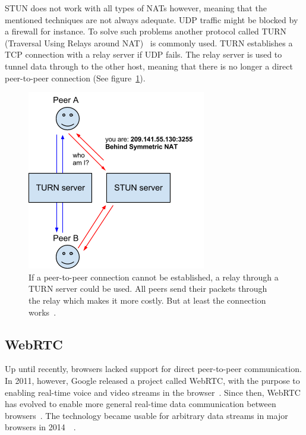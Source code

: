 STUN does not work with all types of NATs however, meaning that the mentioned techniques are not always adequate. UDP traffic might be blocked by a firewall for instance. To solve such problems another protocol called TURN (Traversal Using Relays around NAT)~\cite{RFC5766:Online} is commonly used. TURN establishes a TCP connection with a relay server if UDP fails. The relay server is used to tunnel data through to the other host, meaning that there is no longer a direct peer-to-peer connection (See figure~\ref{fig:WebRTC - TURN}).

\begin{figure}[htp]
\centering
\includegraphics[width=\textwidth,height=0.2\paperheight,keepaspectratio
]{figures/webrtc-turn}
\caption{If a peer-to-peer connection cannot be established, a relay through a TURN server could be used. All peers send their packets through the relay which makes it more costly. But at least the connection works~\cite{WebRTCArchitecture:2014:Online}.}
\label{fig:WebRTC - TURN}
\end{figure}

\subsection{WebRTC}

Up until recently, browsers lacked support for direct peer-to-peer communication. In 2011, however, Google released a project called WebRTC, with the purpose to enabling real-time voice and video streams in the browser~\cite{WebRTCMemo:Online}. Since then, WebRTC has evolved to enable more general real-time data communication between browsers~\cite{WebRTC:Online}. The technology became usable for arbitrary data streams in major browsers in 2014~\cite{WebRTCChrome:Online}~\cite{WebRTCFirefox:Online}.

